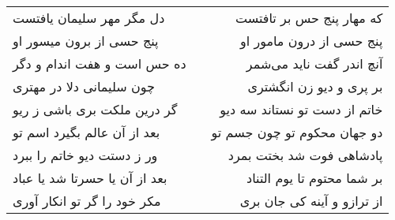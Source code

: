 \begin{center}
\begin{longtable}{l p{0.5cm} r}
\\
دل مگر مهر سلیمان یافتست
&&
که مهار پنج حس بر تافتست
\\
پنج حسی از برون میسور او
&&
پنج حسی از درون مامور او
\\
ده حس است و هفت اندام و دگر
&&
آنچ اندر گفت ناید می‌شمر
\\
چون سلیمانی دلا در مهتری
&&
بر پری و دیو زن انگشتری
\\
گر درین ملکت بری باشی ز ریو
&&
خاتم از دست تو نستاند سه دیو
\\
بعد از آن عالم بگیرد اسم تو
&&
دو جهان محکوم تو چون جسم تو
\\
ور ز دستت دیو خاتم را ببرد
&&
پادشاهی فوت شد بختت بمرد
\\
بعد از آن یا حسرتا شد یا عباد
&&
بر شما محتوم تا یوم التناد
\\
مکر خود را گر تو انکار آوری
&&
از ترازو و آینه کی جان بری
\\
\end{longtable}
\end{center}

